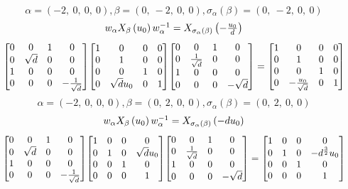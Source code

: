 \documentclass[11pt]{article}
\theoremstyle{definition}
\begin{document}
\[
\alpha = \left( -2, \  0, \  0, \  0\right), \beta = \left( 0, \  -2, \  0, \  0\right), \sigma_{\alpha}(\beta) = \left( 0, \  -2, \  0, \  0\right)
\]
\[
\scaletoalign{\textwidth}{w_{\alpha} X_{\beta}\left(u_{0}\right) w_{\alpha}^{-1} = X_{\sigma_{\alpha}\left(\beta\right)}\left(- \frac{u_{0}}{d}\right)}
\]
\[
\scaletoalign{\textwidth}{{\left[\begin{matrix}0 & 0 & 1 & 0\\0 & \sqrt{d} & 0 & 0\\1 & 0 & 0 & 0\\0 & 0 & 0 & - \frac{1}{\sqrt{d}}\end{matrix}\right]} {\left[\begin{matrix}1 & 0 & 0 & 0\\0 & 1 & 0 & 0\\0 & 0 & 1 & 0\\0 & \sqrt{d} u_{0} & 0 & 1\end{matrix}\right]} {\left[\begin{matrix}0 & 0 & 1 & 0\\0 & \frac{1}{\sqrt{d}} & 0 & 0\\1 & 0 & 0 & 0\\0 & 0 & 0 & - \sqrt{d}\end{matrix}\right]} = {\left[\begin{matrix}1 & 0 & 0 & 0\\0 & 1 & 0 & 0\\0 & 0 & 1 & 0\\0 & - \frac{u_{0}}{\sqrt{d}} & 0 & 1\end{matrix}\right]}}
\]
\[
\alpha = \left( -2, \  0, \  0, \  0\right), \beta = \left( 0, \  2, \  0, \  0\right), \sigma_{\alpha}(\beta) = \left( 0, \  2, \  0, \  0\right)
\]
\[
\scaletoalign{\textwidth}{w_{\alpha} X_{\beta}\left(u_{0}\right) w_{\alpha}^{-1} = X_{\sigma_{\alpha}\left(\beta\right)}\left(- d u_{0}\right)}
\]
\[
\scaletoalign{\textwidth}{{\left[\begin{matrix}0 & 0 & 1 & 0\\0 & \sqrt{d} & 0 & 0\\1 & 0 & 0 & 0\\0 & 0 & 0 & - \frac{1}{\sqrt{d}}\end{matrix}\right]} {\left[\begin{matrix}1 & 0 & 0 & 0\\0 & 1 & 0 & \sqrt{d} u_{0}\\0 & 0 & 1 & 0\\0 & 0 & 0 & 1\end{matrix}\right]} {\left[\begin{matrix}0 & 0 & 1 & 0\\0 & \frac{1}{\sqrt{d}} & 0 & 0\\1 & 0 & 0 & 0\\0 & 0 & 0 & - \sqrt{d}\end{matrix}\right]} = {\left[\begin{matrix}1 & 0 & 0 & 0\\0 & 1 & 0 & - d^{\frac{3}{2}} u_{0}\\0 & 0 & 1 & 0\\0 & 0 & 0 & 1\end{matrix}\right]}}
\]
\end{document}
